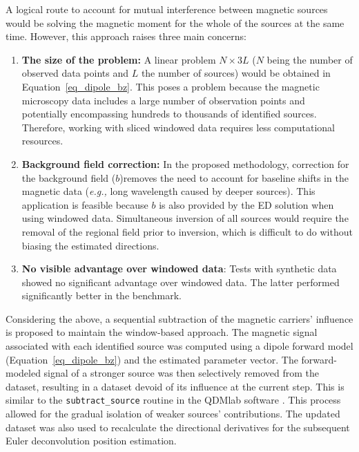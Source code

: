 \documentclass[onecolumn,12pt,a4paper]{article}
\begin{document}
    A logical route to account for mutual interference between magnetic sources would be solving the magnetic moment for the whole of the sources at the same time. However, this approach raises three main concerns:

    \begin{enumerate}
        \item \textbf{The size of the problem:} A linear problem $N \times 3L$ ($N$ being the number of observed data points and $L$ the number of sources) would be obtained in Equation~\ref{eq_dipole_bz}. This poses a problem because the magnetic microscopy data includes a large number of observation points and potentially encompassing hundreds to thousands of identified sources. Therefore, working with sliced windowed data requires less computational resources.

        \item \textbf{Background field correction:} In the proposed methodology, correction for the background field ($b$)removes the need to account for baseline shifts in the magnetic data (\textit{e.g.,} long wavelength caused by deeper sources). This application is feasible because $b$ is also provided by the ED solution when using windowed data. Simultaneous inversion of all sources would require the removal of the regional field prior to inversion, which is difficult to do without biasing the estimated directions.

        \item \textbf{No visible advantage over windowed data}: Tests with synthetic data \citep[see supplementary Jupyter notebooks in][]{figshare} showed no significant advantage over windowed data. The latter performed significantly better in the benchmark.

    \end{enumerate}

    Considering the above, a sequential subtraction of the magnetic carriers' influence is proposed to maintain the window-based approach. The magnetic signal associated with each identified source was computed using a dipole forward model (Equation~\ref{eq_dipole_bz}) and the estimated parameter vector. The forward-modeled signal of a stronger source was then selectively removed from the dataset, resulting in a dataset devoid of its influence at the current step. 
    This is similar to the \texttt{subtract\_source} routine in the QDMlab software \citep{Volk2022}. This process allowed for the gradual isolation of weaker sources' contributions. The updated dataset was also used to recalculate the directional derivatives for the subsequent Euler deconvolution position estimation.
\end{document}
